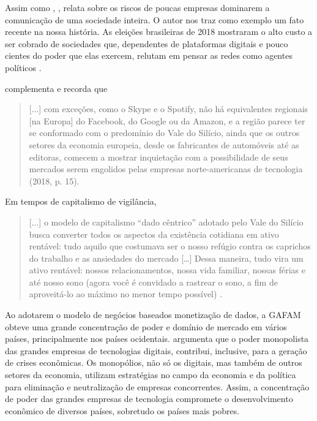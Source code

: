 \documentclass[portuguese]{textolivre}
\begin{document}
Assim como \textcite{freire_educar_2011}, \textcite{morozov2018}, relata sobre os riscos de poucas empresas dominarem a comunicação de uma sociedade inteira. O autor nos traz como exemplo um fato recente na nossa história. As eleições brasileiras de 2018 mostraram o alto custo a ser cobrado de sociedades que, dependentes de plataformas digitais e pouco cientes do poder que elas exercem, relutam em pensar as redes como agentes políticos \cite[p. 8]{morozov2018}.

\textcite{morozov2018} complementa e recorda que

\begin{quote}
 [...] com exceções, como o Skype e o Spotify, não há equivalentes regionais [na Europa] do Facebook, do Google ou da Amazon, e a região parece ter se conformado com o predomínio do Vale do Silício, ainda que os outros setores da economia europeia, desde os fabricantes de automóveis até as editoras, comecem a mostrar inquietação com a possibilidade de seus mercados serem engolidos pelas empresas norte-americanas de tecnologia (2018, p. 15).
\end{quote}

Em tempos de capitalismo de vigilância,

\begin{quote}
 [...] o modelo de capitalismo “dado cêntrico” adotado pelo Vale do Silício busca converter todos os aspectos da existência cotidiana em ativo rentável: tudo aquilo que costumava ser o nosso refúgio contra os caprichos do trabalho e as ansiedades do mercado […] Dessa maneira, tudo vira um ativo rentável: nossos relacionamentos, nossa vida familiar, nossas férias e até nosso sono (agora você é convidado a rastrear o sono, a fim de aproveitá-lo ao máximo no menor tempo possível) \cite[p. 33]{morozov2018}.
\end{quote}

Ao adotarem o modelo de negócios baseados monetização de dados, a GAFAM obteve uma grande concentração de poder e domínio de mercado em vários países, principalmente nos países ocidentais. \textcite{morozov2018} argumenta que o poder monopolista das grandes empresas de tecnologias digitais, contribui, inclusive, para a geração de crises econômicas. Os monopólios, não só os digitais, mas também de outros setores da economia, utilizam estratégias no campo da economia e da política para eliminação e neutralização de empresas concorrentes. Assim, a concentração de poder das grandes empresas de tecnologia compromete o desenvolvimento econômico de diversos países, sobretudo os países mais pobres.
\end{document}

